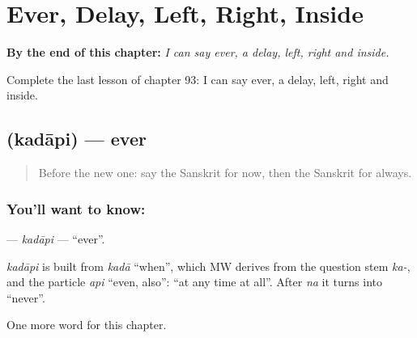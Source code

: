 
\chapter{Ever, Delay, Left, Right, Inside}
\label{ch:sa-ever-delay-left-right-inside}

\begin{chapteropening}
\textbf{By the end of this chapter:} \emph{I can say ever, a delay, left, right and inside.}

Complete the last lesson of chapter 93: I can say ever, a delay, left, right and inside.
\end{chapteropening}

\section[\texorpdfstring{\sk{कदापि} (kadāpi)}{कदापि (kadāpi)}]{ (kadāpi) — ever}

\label{lesson:SA-C93-kadapi}



\begin{quote}
Before the new one: say the Sanskrit for now, then the Sanskrit for always.
\end{quote}

\subsection*{You'll want to know: }
\textbf{} — \emph{kadāpi} — \textquotedblleft{}ever\textquotedblright{}.

\begin{cousinweb}
\emph{kadāpi} is built from \emph{kadā} \textquotedblleft{}when\textquotedblright{}, which MW derives from the question stem \emph{ka-}, and the particle \emph{api} \textquotedblleft{}even, also\textquotedblright{}: \textquotedblleft{}at any time at all\textquotedblright{}. After \emph{na} it turns into \textquotedblleft{}never\textquotedblright{}.
\end{cousinweb}

\begin{grammarlens}[title={What you've built}]
One more word for this chapter.
\end{grammarlens}

